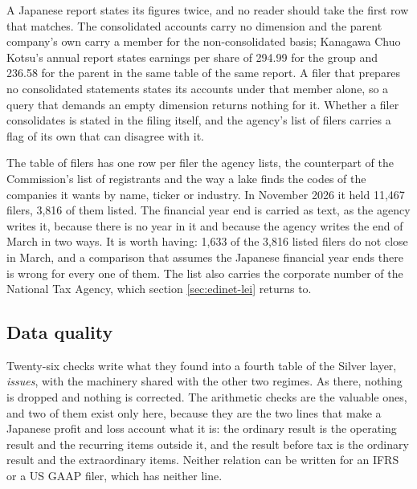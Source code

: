 A Japanese report states its figures twice, and no reader should take the first row that matches. The consolidated accounts carry no dimension and the parent company's own carry a member for the non-consolidated basis; Kanagawa Chuo Kotsu's annual report states earnings per share of 294.99 for the group and 236.58 for the parent in the same table of the same report. A filer that prepares no consolidated statements states its accounts under that member alone, so a query that demands an empty dimension returns nothing for it. Whether a filer consolidates is stated in the filing itself, and the agency's list of filers carries a flag of its own that can disagree with it.

The table of filers has one row per filer the agency lists, the counterpart of the Commission's list of registrants and the way a lake finds the codes of the companies it wants by name, ticker or industry. In November 2026 it held 11,467 filers, 3,816 of them listed. The financial year end is carried as text, as the agency writes it, because there is no year in it and because the agency writes the end of March in two ways. It is worth having: 1,633 of the 3,816 listed filers do not close in March, and a comparison that assumes the Japanese financial year ends there is wrong for every one of them. The list also carries the corporate number of the National Tax Agency, which section \ref{sec:edinet-lei} returns to.

\subsection{Data quality}

Twenty-six checks write what they found into a fourth table of the Silver layer, \emph{issues}, with the machinery shared with the other two regimes. As there, nothing is dropped and nothing is corrected. The arithmetic checks are the valuable ones, and two of them exist only here, because they are the two lines that make a Japanese profit and loss account what it is: the ordinary result is the operating result and the recurring items outside it, and the result before tax is the ordinary result and the extraordinary items. Neither relation can be written for an IFRS or a US GAAP filer, which has neither line.

